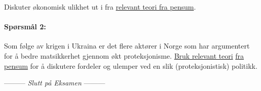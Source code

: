 \documentclass[a4paper,12pt,fleqn]{article}
\newcommand{\sisteord}{Slutt på Eksamen}
\begin{document}
Diskuter økonomisk ulikhet ut i fra \underline{relevant teori fra pensum}.

\paragraph{\textbf{Spørsmål 2:}}

Som følge av krigen i Ukraina er det flere aktører i Norge som har argumentert
for å bedre matsikkerhet gjennom økt proteksjonisme. \underline{Bruk relevant
teori} \underline{fra pensum} for å diskutere fordeler og ulemper ved en slik
(proteksjonistisk) politikk.

\begin{center}
\vspace{3cm}
--------- \textit{\sisteord} ---------
\end{center}

\label{finalpage}
\end{document}
